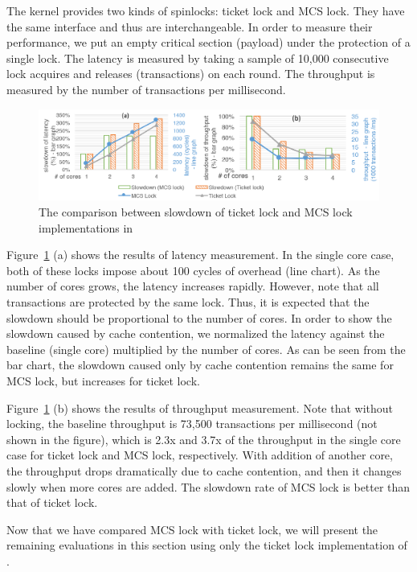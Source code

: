 The {\cCTOS} kernel provides two kinds of spinlocks: ticket lock and MCS lock. They
have the same interface and thus are interchangeable. In order to measure
their performance, we put an empty critical section (payload) under the
protection of a single lock. The latency is measured by taking a sample of 10,000
consecutive lock acquires and releases (transactions) on each round. The
throughput is measured by the number of transactions per millisecond.

\begin{figure}\centering
	\hspace{-.2cm}
	\includegraphics[width=15cm]{figs/locks.pdf}
	\hspace{-.2cm}
	\caption{The comparison between slowdown of ticket lock and MCS lock implementations in \cCTOS{}}
	\label{fig:locks}
	\hrulefill
\end{figure}

Figure~\ref{fig:locks} (a) shows the results of latency measurement. In the
single core case, both of these locks impose about 100 cycles of overhead (line chart). 
As the number of cores grows, the latency increases rapidly. However, note
that all transactions are protected by the same lock. Thus, it is expected that
the slowdown should be proportional to the number of cores. In order to show the
slowdown caused by cache contention, we normalized the latency against the
baseline (single core) multiplied by the number of cores. As can be seen from 
the bar chart, the slowdown caused only by cache
contention remains the same for MCS lock, but increases for ticket lock.

Figure~\ref{fig:locks} (b) shows the results of throughput measurement.
Note that without locking, the baseline throughput is 73,500 transactions per millisecond
(not shown in the figure), which is
2.3x and 3.7x of the throughput in the single core case for ticket lock and MCS lock,
respectively. With addition of another core, the throughput drops dramatically
due to cache contention, and then it changes slowly when more cores are added.
The slowdown rate of MCS lock is better than that of ticket lock.

Now that we have compared MCS lock with ticket lock, we will present the
remaining evaluations in this section using only the ticket lock implementation
of \cCTOS{}.

